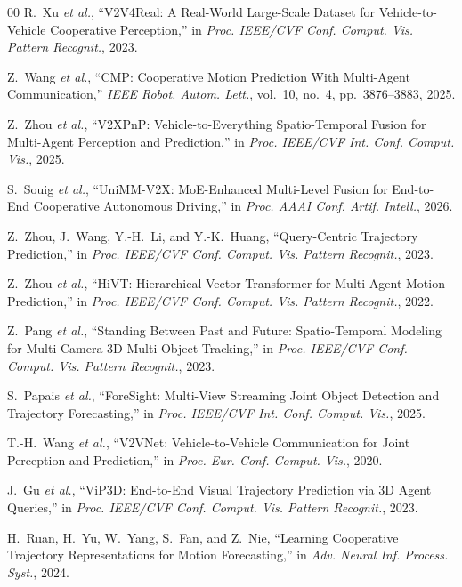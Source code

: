 \documentclass[lettersize,journal]{IEEEtran}
\begin{document}
\begin{thebibliography}{00}
R.~Xu \emph{et al.}, ``V2V4Real: A Real-World Large-Scale Dataset for Vehicle-to-Vehicle Cooperative Perception,'' in \emph{Proc. IEEE/CVF Conf. Comput. Vis. Pattern Recognit.}, 2023.

Z.~Wang \emph{et al.}, ``CMP: Cooperative Motion Prediction With Multi-Agent Communication,'' \emph{IEEE Robot. Autom. Lett.}, vol.~10, no.~4, pp.~3876--3883, 2025.

Z.~Zhou \emph{et al.}, ``V2XPnP: Vehicle-to-Everything Spatio-Temporal Fusion for Multi-Agent Perception and Prediction,'' in \emph{Proc. IEEE/CVF Int. Conf. Comput. Vis.}, 2025.

S.~Souig \emph{et al.}, ``UniMM-V2X: MoE-Enhanced Multi-Level Fusion for End-to-End Cooperative Autonomous Driving,'' in \emph{Proc. AAAI Conf. Artif. Intell.}, 2026.

Z.~Zhou, J.~Wang, Y.-H.~Li, and Y.-K.~Huang, ``Query-Centric Trajectory Prediction,'' in \emph{Proc. IEEE/CVF Conf. Comput. Vis. Pattern Recognit.}, 2023.

Z.~Zhou \emph{et al.}, ``HiVT: Hierarchical Vector Transformer for Multi-Agent Motion Prediction,'' in \emph{Proc. IEEE/CVF Conf. Comput. Vis. Pattern Recognit.}, 2022.

Z.~Pang \emph{et al.}, ``Standing Between Past and Future: Spatio-Temporal Modeling for Multi-Camera 3D Multi-Object Tracking,'' in \emph{Proc. IEEE/CVF Conf. Comput. Vis. Pattern Recognit.}, 2023.

S.~Papais \emph{et al.}, ``ForeSight: Multi-View Streaming Joint Object Detection and Trajectory Forecasting,'' in \emph{Proc. IEEE/CVF Int. Conf. Comput. Vis.}, 2025.

T.-H.~Wang \emph{et al.}, ``V2VNet: Vehicle-to-Vehicle Communication for Joint Perception and Prediction,'' in \emph{Proc. Eur. Conf. Comput. Vis.}, 2020.

J.~Gu \emph{et al.}, ``ViP3D: End-to-End Visual Trajectory Prediction via 3D Agent Queries,'' in \emph{Proc. IEEE/CVF Conf. Comput. Vis. Pattern Recognit.}, 2023.

H.~Ruan, H.~Yu, W.~Yang, S.~Fan, and Z.~Nie, ``Learning Cooperative Trajectory Representations for Motion Forecasting,'' in \emph{Adv. Neural Inf. Process. Syst.}, 2024.


\end{thebibliography}
\end{document}
